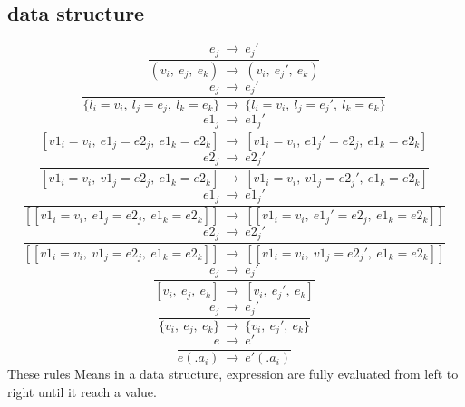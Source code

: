\documentclass[10pt,a4paper]{article}
\begin{document}
\subsection*{ data structure }
\begin{equation}\frac{e_j\ \rightarrow \ e_j'}{(v_i,\ e_j,\ e_k)\ \rightarrow \ (v_i,\ e_j',\ e_k)}\ \tag{\ E-TUPLES\ }\end{equation}
\begin{equation}\frac{e_j\ \rightarrow \ e_j'}{\{l_i=v_i,\ l_j=e_j,\ l_k=e_k\}\ \rightarrow \ \{l_i=v_i,\ l_j=e_j',\ l_k=e_k\}}\ \tag{\ E-RECORDS\ }\end{equation}
\begin{equation}\frac{e1_j\ \rightarrow \ e1_j'}{[v1_i=v_i,\ e1_j=e2_j,\ e1_k=e2_k]\ \rightarrow \ [v1_i=v_i,\ e1_j'=e2_j,\ e1_k=e2_k]}\ \tag{\ E-MAP\ }\end{equation}
\begin{equation}\frac{e2_j\ \rightarrow \ e2_j'}{[v1_i=v_i,\ v1_j=e2_j,\ e1_k=e2_k]\ \rightarrow \ [v1_i=v_i,\ v1_j=e2_j',\ e1_k=e2_k]}\ \tag{\ E-MAP\ }\end{equation}
\begin{equation}\frac{e1_j\ \rightarrow \ e1_j'}{[[v1_i=v_i,\ e1_j=e2_j,\ e1_k=e2_k]]\ \rightarrow \ [[v1_i=v_i,\ e1_j'=e2_j,\ e1_k=e2_k]]}\ \tag{\ E-BIGMAP\ }\end{equation}
\begin{equation}\frac{e2_j\ \rightarrow \ e2_j'}{[[v1_i=v_i,\ v1_j=e2_j,\ e1_k=e2_k]]\ \rightarrow \ [[v1_i=v_i,\ v1_j=e2_j',\ e1_k=e2_k]]}\ \tag{\ E-BIGMAP\ }\end{equation}
\begin{equation}\frac{e_j\ \rightarrow \ e_j'}{[v_i,\ e_j,\ e_k]\ \rightarrow \ [v_i,\ e_j',\ e_k]}\ \tag{\ E-LIST\ }\end{equation}
\begin{equation}\frac{e_j\ \rightarrow \ e_j'}{\{v_i,\ e_j,\ e_k\}\ \rightarrow \ \{v_i,\ e_j',\ e_k\}}\ \tag{\ E-SET\ }\end{equation}
\begin{equation}\frac{e\ \rightarrow \ e'}{e(.a_i)\ \rightarrow \ e'(.a_i)}\ \tag{\ E-ACCESS\ }\end{equation}
These rules Means in a data structure, expression are fully evaluated from left to right until it reach a value.
\end{document}
